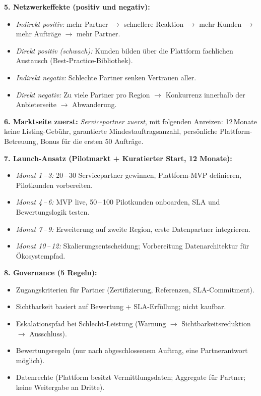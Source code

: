\documentclass[11pt,a4paper,oneside]{article}
\begin{document}
\begin{loesungbox}
\textbf{5. Netzwerkeffekte (positiv und negativ):}
\begin{itemize}
  \item \emph{Indirekt positiv:} mehr Partner $\rightarrow$ schnellere Reaktion $\rightarrow$ mehr Kunden $\rightarrow$ mehr Aufträge $\rightarrow$ mehr Partner.
  \item \emph{Direkt positiv (schwach):} Kunden bilden über die Plattform fachlichen Austausch (Best-Practice-Bibliothek).
  \item \emph{Indirekt negativ:} Schlechte Partner senken Vertrauen aller.
  \item \emph{Direkt negativ:} Zu viele Partner pro Region $\rightarrow$ Konkurrenz innerhalb der Anbieterseite $\rightarrow$ Abwanderung.
\end{itemize}

\textbf{6. Marktseite zuerst:}
\emph{Servicepartner zuerst}, mit folgenden Anreizen: 12\,Monate keine Listing-Gebühr, garantierte Mindestauftragsanzahl, persönliche Plattform-Betreuung, Bonus für die ersten 50 Aufträge.

\textbf{7. Launch-Ansatz (Pilotmarkt + Kuratierter Start, 12 Monate):}
\begin{itemize}
  \item \emph{Monat 1\,--\,3:} 20\,--\,30 Servicepartner gewinnen, Plattform-MVP definieren, Pilotkunden vorbereiten.
  \item \emph{Monat 4\,--\,6:} MVP live, 50\,--\,100 Pilotkunden onboarden, SLA und Bewertungslogik testen.
  \item \emph{Monat 7\,--\,9:} Erweiterung auf zweite Region, erste Datenpartner integrieren.
  \item \emph{Monat 10\,--\,12:} Skalierungsentscheidung; Vorbereitung Datenarchitektur für Ökosystempfad.
\end{itemize}

\textbf{8. Governance (5 Regeln):}
\begin{itemize}
  \item Zugangskriterien für Partner (Zertifizierung, Referenzen, SLA-Commitment).
  \item Sichtbarkeit basiert auf Bewertung + SLA-Erfüllung; nicht kaufbar.
  \item Eskalationspfad bei Schlecht-Leistung (Warnung $\rightarrow$ Sichtbarkeitsreduktion $\rightarrow$ Ausschluss).
  \item Bewertungsregeln (nur nach abgeschlossenem Auftrag, eine Partnerantwort möglich).
  \item Datenrechte (Plattform besitzt Vermittlungsdaten; Aggregate für Partner; keine Weitergabe an Dritte).
\end{itemize}


\end{loesungbox}
\end{document}
